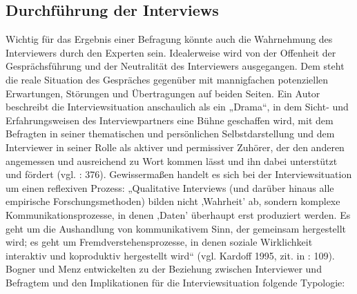 \subsection{Durchführung der Interviews} 
Wichtig für das Ergebnis einer Befragung könnte auch die Wahrnehmung des Interviewers durch den Experten sein. Idealerweise wird von der Offenheit der Gesprächsführung und der Neutralität des Interviewers ausgegangen. Dem steht die reale Situation des Gespräches gegenüber mit mannigfachen potenziellen Erwartungen, Störungen und Übertragungen auf beiden Seiten. Ein Autor beschreibt die Interviewsituation anschaulich als ein „Drama“, in dem Sicht- und Erfahrungsweisen des Interviewpartners eine Bühne geschaffen wird, mit dem Befragten in seiner thematischen und persönlichen Selbstdarstellung und dem Interviewer in seiner Rolle als aktiver und permissiver Zuhörer, der den anderen angemessen und ausreichend zu Wort kommen lässt und ihn dabei unterstützt und fördert (vgl. \cite{herm00} : 376). Gewissermaßen handelt es sich bei der Interviewsituation um einen reflexiven Prozess: „Qualitative Interviews (und darüber hinaus alle empirische Forschungsmethoden) bilden nicht ‚Wahrheit’ ab, sondern komplexe Kommunikationsprozesse, in denen ‚Daten’ überhaupt erst produziert werden. Es geht um die Aushandlung von kommunikativem Sinn, der gemeinsam hergestellt wird; es geht um Fremdverstehensprozesse, in denen soziale Wirklichkeit interaktiv und koproduktiv hergestellt wird“ (vgl. Kardoff 1995, zit. in \cite{kruse} : 109). Bogner und Menz entwickelten zu der Beziehung zwischen Interviewer und Befragtem und den Implikationen für die Interviewsituation folgende Typologie:
